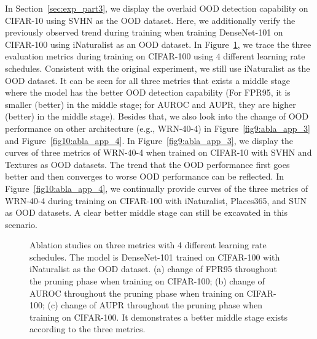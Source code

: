 \documentclass{article}
\theoremstyle{plain}
\theoremstyle{definition}
\theoremstyle{remark}
\begin{document}
In Section~\ref{sec:exp_part3}, we display the overlaid OOD detection capability on CIFAR-10 using SVHN as the OOD dataset. Here, we additionally verify the previously observed trend during training when training DenseNet-101 on CIFAR-100 using iNaturalist as an OOD dataset. In Figure~\ref{fig8:abla_app_2}, we trace the three evaluation metrics during training on CIFAR-100 using $4$ different learning rate schedules. Consistent with the original experiment, we still use iNaturalist as the OOD dataset. It can be seen for all three metrics that exists a middle stage where the model has the better OOD detection capability (For FPR95, it is smaller (better) in the middle stage; for AUROC and AUPR, they are higher (better) in the middle stage). Besides that, we also look into the change of OOD performance on other architecture (e.g., WRN-40-4) in Figure~\ref{fig9:abla_app_3} and Figure~\ref{fig10:abla_app_4}. In Figure~\ref{fig9:abla_app_3}, we display the curves of three metrics of WRN-40-4 when trained on CIFAR-10 with SVHN and Textures as OOD datasets.  The trend that the OOD performance first goes better and then converges to worse OOD performance can be reflected. In Figure~\ref{fig10:abla_app_4}, we continually provide curves of the three metrics of WRN-40-4 during training on CIFAR-100 with iNaturalist, Places365, and SUN as OOD datasets. A clear better middle stage can still be 
excavated in this scenario.

\begin{figure}[t!]
    \begin{center}

    \end{center}
    \caption{Ablation studies on three metrics with 4 different learning rate schedules. The model is DenseNet-101 trained on CIFAR-100 with iNaturalist as the OOD dataset. (a) change of FPR95 throughout the pruning phase when training on CIFAR-100; (b) change of AUROC throughout the pruning phase when training on CIFAR-100; (c) change of AUPR throughout the pruning phase when training on CIFAR-100. It demonstrates a better middle stage exists according to the three metrics.}
    \label{fig8:abla_app_2}
\end{figure}
\end{document}

